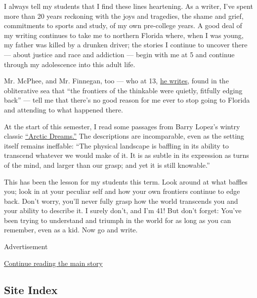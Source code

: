 I always tell my students that I find these lines heartening. As a
writer, I've spent more than 20 years reckoning with the joys and
tragedies, the shame and grief, commitments to sports and study, of my
own pre-college years. A good deal of my writing continues to take me to
northern Florida where, when I was young, my father was killed by a
drunken driver; the stories I continue to uncover there --- about
justice and race and addiction --- begin with me at 5 and continue
through my adolescence into this adult life.

Mr. McPhee, and Mr. Finnegan, too --- who at 13,
\href{https://www.newyorker.com/magazine/2015/06/01/off-diamond-head-finnegan}{he
writes}, found in the obliterative sea that ``the frontiers of the
thinkable were quietly, fitfully edging back'' --- tell me that there's
no good reason for me ever to stop going to Florida and attending to
what happened there.

At the start of this semester, I read some passages from Barry Lopez's
wintry classic
\href{https://books.google.com/books?id=Y-WxJYMD5HsC\&pg=PT11\&lpg=PT11\&dq=\%22It+is+as+subtle+in+its+expression+as+turns+of+the+mind\%22\&source=bl\&ots=E13jUzsHZm\&sig=TuD6gkf-AeDo_R4d0fwtYDYSVxo\&hl=en\&sa=X\&ved=0ahUKEwiC5KOQ1bfaAhULd98KHb32CtwQ6AEIKjAB\#v=onepage\&q=\%22It\%20is\%20as\%20subtle\%20in\%20its\%20expression\%20as\%20turns\%20of\%20the\%20mind\%22\&f=false}{``Arctic
Dreams.''} The descriptions are incomparable, even as the setting itself
remains ineffable: ``The physical landscape is baffling in its ability
to transcend whatever we would make of it. It is as subtle in its
expression as turns of the mind, and larger than our grasp; and yet it
is still knowable.''

This has been the lesson for my students this term. Look around at what
baffles you; look in at your peculiar self and how your own frontiers
continue to edge back. Don't worry, you'll never fully grasp how the
world transcends you and your ability to describe it. I surely don't,
and I'm 41! But don't forget: You've been trying to understand and
triumph in the world for as long as you can remember, even as a kid. Now
go and write.

Advertisement

\protect\hyperlink{after-bottom}{Continue reading the main story}

\hypertarget{site-index}{%
\subsection{Site Index}\label{site-index}}

